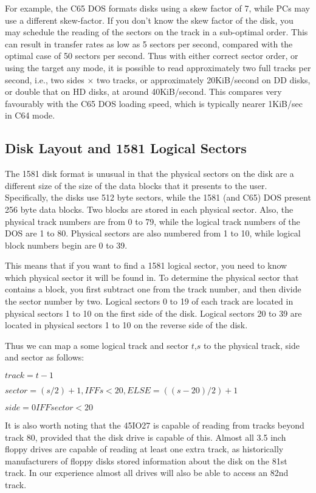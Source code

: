 For example,
the C65 DOS formats disks using a skew factor of 7, while PCs may use
a different skew-factor. If you don't know the skew factor of the disk,
you may schedule the reading of the sectors on the track in a sub-optimal
order. This can result in transfer rates as low as 5 sectors per second,
compared with the optimal case of 50 sectors per second.
Thus with either correct sector order, or using the target any mode,
it is possible to read approximately two full tracks per second,
i.e., two sides $\times$ two tracks, or approximately 20KiB/second on
DD disks, or double that on HD disks, at around 40KiB/second.  This
compares very favourably with the C65 DOS loading speed, which is
typically nearer 1KiB/sec in C64 mode.

\subsection{Disk Layout and 1581 Logical Sectors}

The 1581 disk format is unusual in that the physical sectors on the
disk are a different size of the size of the data blocks that it
presents to the user.  Specifically, the disks use 512 byte sectors,
while the 1581 (and C65) DOS present 256 byte data blocks.
Two blocks are stored in each physical sector.  Also, the physical
track numbers are from 0 to 79, while the logical track numbers of the
DOS are 1 to 80.  Physical sectors are also numbered from 1 to 10,
while logical block numbers begin are 0 to 39.

This means that if you want to find a 1581 logical sector, you need to
know which physical sector it will be found in.  To determine the
physical sector that contains a block, you first subtract one from the
track number, and then divide the sector number by two.  Logical
sectors 0 to 19 of each track are located in physical sectors 1 to 10
on the first side of the disk.  Logical sectors 20 to 39 are 
located in physical sectors 1 to 10 on the reverse side of the disk.  

Thus we can map a some logical track and sector $t$,$s$ to the
physical track, side and sector as follows:

$track = t - 1$

$sector = (s/2)+1, IFF s < 20, ELSE = ((s-20)/2) + 1$

$side = 0 IFF sector < 20$

It is also worth noting that the 45IO27 is capable of reading from
tracks beyond track 80, provided that the disk drive is capable of
this.  Almost all 3.5 inch floppy drives are capable of reading at
least one extra track, as historically manufacturers of floppy disks
stored information about the disk on the 81st track.  In our
experience almost all drives will also be able to access an 82nd
track.

